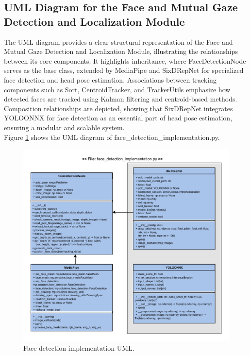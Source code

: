 \documentclass{CSSRforAfrica}
\begin{document}
{\subsection*{UML Diagram for the Face and Mutual Gaze Detection and Localization Module}
The UML diagram provides a clear structural representation of the Face and Mutual Gaze Detection and Localization Module, illustrating the relationships between its core components. It highlights inheritance, where FaceDetectionNode serves as the base class, extended by MediaPipe and SixDRepNet for specialized face detection and head pose estimation. Associations between tracking components such as Sort, CentroidTracker, and TrackerUtils emphasize how detected faces are tracked using Kalman filtering and centroid-based methods. Composition relationships are depicted, showing that SixDRepNet integrates YOLOONNX for face detection as an essential part of head pose estimation, ensuring a modular and scalable system.\\

Figure \ref{fig: Face_implementation_UML} shows the UML diagram of face\_detection\_implementation.py.

\begin{figure}[!hbpt]
	\centering
	\hspace*{-0.5cm} %
	\includegraphics[scale=0.85]{images/Face_implementation_UML.pdf}
	\caption{Face detection implementation UML.}
	\label{fig: Face_implementation_UML}
\end{figure}

}
\end{document}
